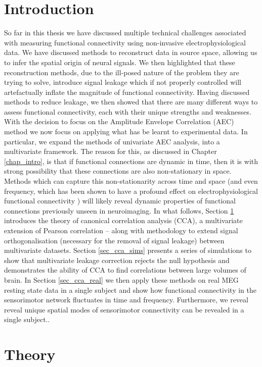 \section*{Introduction}
So far in this thesis we have discussed multiple technical challenges associated with measuring functional connectivity using non-invasive electrophysiological data. We have discussed methods to reconstruct data in source space, allowing us to infer the spatial origin of neural signals. We then highlighted that these reconstruction methods, due to the ill-posed nature of the problem they are trying to solve, introduce signal leakage which if not properly controlled will artefactually inflate the magnitude of functional connectivity. Having discussed methods to reduce leakage, we then showed that there are many different ways to assess functional connectivity, each with their unique strengths and weaknesses. With the decision to focus on the Amplitude Envelope Correlation (AEC) method we now focus on applying what has be learnt to experimental data. In particular, we expand the methods of univariate AEC analysis, into a multivariate framework. The reason for this, as discussed in Chapter \ref{chap_intro}, is that if functional connections are dynamic in time, then it is with strong possibility that these connections are also non-stationary in space. Methods which can capture this non-stationarity across time and space (and even frequency, which has been shown to have a profound effect on electrophysiological functional connectivity \citep{Brookes2012a}) will likely reveal dynamic properties of functional connections previously unseen in neuroimaging. In what follows, Section \ref{sec_cca_theory} introduces the theory of canonical correlation analysis (CCA), a multivariate extension of Pearson correlation -- along with methodology to extend signal orthogonalisation (necessary for the removal of signal leakage) between multivariate datasets. Section \ref{sec_cca_sims} presents a series of simulations to show that multivariate leakage correction rejects the null hypothesis and demonstrates the ability of CCA to find correlations between large volumes of brain. In Section \ref{sec_cca_real} we then apply these methods on real MEG resting state data in a single subject and show how functional connectivity in the sensorimotor network fluctuates in time and frequency. Furthermore, we reveal reveal unique spatial modes of sensorimotor connectivity can be revealed in a single subject..

\section{Theory}\label{sec_cca_theory}

